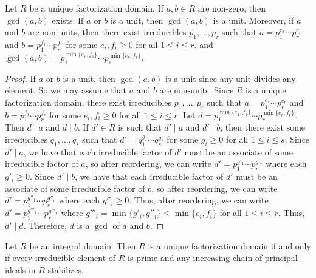\begin{proposition}
    Let $R$ be a unique factorization domain. If $a,b \in R$ are non-zero, then $\gcd(a,b)$ exists. If $a$ or $b$ is a unit, then $\gcd(a,b)$ is a unit. Moreover, if $a$ and $b$ are non-units, then there exist irreducibles $p_{1},\ldots,p_{r}$ such that $a = p_{1}^{e_{1}} \cdots p_{r}^{e_{r}}$ and $b = p_{1}^{f_{1}} \cdots p_{r}^{f_{r}}$ for some $e_{i},f_{i} \geq 0$ for all $1 \leq i \leq r$, and $\gcd(a,b) = p_{1}^{\min\{e_{1},f_{1}\}} \cdots p_{r}^{\min\{e_{r},f_{r}\}}$.
\end{proposition}
\begin{proof}
    If $a$ or $b$ is a unit, then $\gcd(a,b)$ is a unit since any unit divides any element. So we may assume that $a$ and $b$ are non-units. Since $R$ is a unique factorization domain, there exist irreducibles $p_{1},\ldots,p_{r}$ such that $a = p_{1}^{e_{1}} \cdots p_{r}^{e_{r}}$ and $b = p_{1}^{f_{1}} \cdots p_{r}^{f_{r}}$ for some $e_{i},f_{i} \geq 0$ for all $1 \leq i \leq r$. Let $d = p_{1}^{\min\{e_{1},f_{1}\}} \cdots p_{r}^{\min\{e_{r},f_{r}\}}$. Then $d \mid a$ and $d \mid b$. If $d' \in R$ is such that $d' \mid a$ and $d' \mid b$, then there exist some irreducibles $q_{1},\ldots,q_{s}$ such that $d' = q_{1}^{g_{1}} \cdots q_{s}^{g_{s}}$ for some $g_{i} \geq 0$ for all $1 \leq i \leq s$. Since $d' \mid a$, we have that each irreducible factor of $d'$ must be an associate of some irreducible factor of $a$, so after reordering, we can write $d' = p_{1}^{g'_{1}} \cdots p_{r}^{g'_{r}}$ where each $g'_{i} \geq 0$. Since $d' \mid b$, we have that each irreducible factor of $d'$ must be an associate of some irreducible factor of $b$, so after reordering, we can write $d' = p_{1}^{g''_{1}} \cdots p_{r}^{g''_{r}}$ where each $g''_{i} \geq 0$. Thus, after reordering, we can write $d' = p_{1}^{g'''_{1}} \cdots p_{r}^{g'''_{r}}$ where $g'''_{i} = \min\{g'_{i},g''_{i}\} \leq \min\{e_{i},f_{i}\}$ for all $1 \leq i \leq r$. Thus, $d' \mid d$. Therefore, $d$ is a $\gcd$ of $a$ and $b$.
\end{proof}

\begin{proposition}
    Let $R$ be an integral domain. Then $R$ is a unique factorization domain if and only if every irreducible element of $R$ is prime and any increasing chain of principal ideals in $R$ stabilizes.
\end{proposition}

